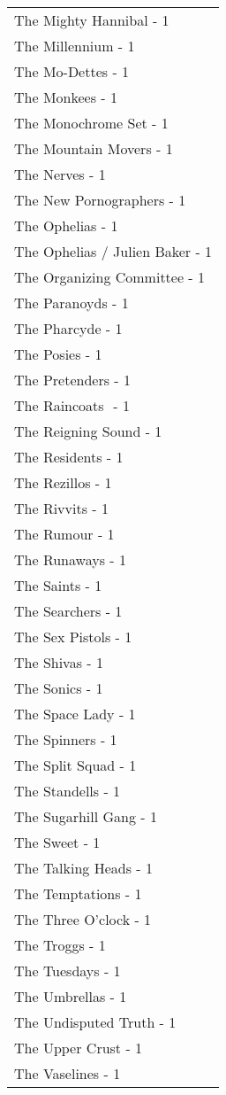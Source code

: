 \documentclass[
]{article}
\begin{document}
\begin{longtable}{l}
The Mighty Hannibal - 1 \\ 
The Millennium - 1 \\ 
The Mo-Dettes - 1 \\ 
The Monkees - 1 \\ 
The Monochrome Set - 1 \\ 
The Mountain Movers - 1 \\ 
The Nerves - 1 \\ 
The New Pornographers - 1 \\ 
The Ophelias - 1 \\ 
The Ophelias / Julien Baker - 1 \\ 
The Organizing Committee - 1 \\ 
The Paranoyds - 1 \\ 
The Pharcyde - 1 \\ 
The Posies - 1 \\ 
The Pretenders - 1 \\ 
The Raincoats ‎ - 1 \\ 
The Reigning Sound - 1 \\ 
The Residents - 1 \\ 
The Rezillos - 1 \\ 
The Rivvits - 1 \\ 
The Rumour - 1 \\ 
The Runaways - 1 \\ 
The Saints - 1 \\ 
The Searchers - 1 \\ 
The Sex Pistols - 1 \\ 
The Shivas - 1 \\ 
The Sonics - 1 \\ 
The Space Lady - 1 \\ 
The Spinners - 1 \\ 
The Split Squad - 1 \\ 
The Standells - 1 \\ 
The Sugarhill Gang - 1 \\ 
The Sweet - 1 \\ 
The Talking Heads - 1 \\ 
The Temptations - 1 \\ 
The Three O’clock - 1 \\ 
The Troggs - 1 \\ 
The Tuesdays - 1 \\ 
The Umbrellas - 1 \\ 
The Undisputed Truth - 1 \\ 
The Upper Crust - 1 \\ 
The Vaselines - 1 \\ 

\end{longtable}
\end{document}
